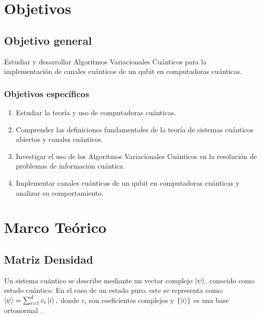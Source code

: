 \documentclass[11pt, spanish, letterpage]{article} %
\newcounter{problem}[section]
\begin{document}
%

\tableofcontents

\bigskip



\section{Objetivos}
\subsection{Objetivo general}

Estudiar y desarrollar Algoritmos Variacionales Cuánticos  para la
implementación de canales cuánticos de un  qubit en computadoras cuánticas.


\subsubsection{Objetivos específicos}


\begin{enumerate}
    \item Estudiar la teoría y uso de computadoras cuánticas.
    \item Comprender las definiciones fundamentales de la teoría de sistemas cuánticos abiertos y canales cuánticos.
    \item Investigar el uso de los Algoritmos Variacionales Cuánticos en la resolución de problemas de información cuántica.
    \item Implementar canales cuánticos de un qubit en computadoras cuánticas y analizar su comportamiento.
\end{enumerate}



\section{Marco Teórico} %

\subsection{Matriz Densidad}

Un sistema cuántico se describe mediante un vector complejo $\ket{\psi}$, conocido como estado cuántico. En el caso de un estado puro, este se representa como: 
$ \ket{\psi} = \sum_{i=1}^{d} c_i \ket{i}, $
donde $c_i$ son coeficientes complejos y $\{\ket{i}\}$ es una base ortonormal \cite{nielsen_chuang_2011}.
\end{document}

